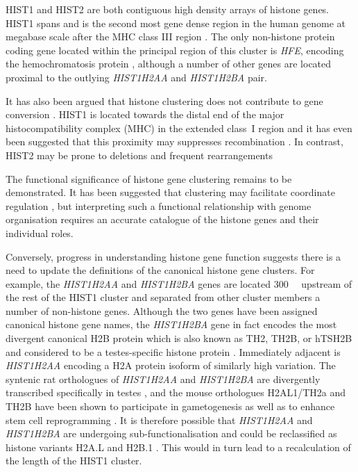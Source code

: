     HIST1 and HIST2 are both contiguous high density arrays of histone genes.
    HIST1 spans 
    and is the second most gene dense region in the human genome at
    megabase scale after the MHC class III region \citep{MHC-III-analysis}.
    The only non-histone protein coding gene located within the principal region of this cluster
    is \textit{HFE}, encoding the hemochromatosis protein \citep{AlbigDoenecke1998},
    although a number of other genes are located
    proximal to the outlying \textit{HIST1H2AA} and \textit{HIST1H2BA} pair.

    It has also been argued that histone clustering
    does not contribute to gene conversion \citep{NeiRooney2005}.
    HIST1 is located towards the distal end of the major histocompatibility complex (MHC)
    in the extended class~I region \citep{MHC-I-transcript, MHC-complete-sequencing-1999}
    and it has even been suggested that this proximity
    may suppresses recombination \citep{MHC-repressed-by-HIST}.
    In contrast, HIST2 may be prone to deletions and frequent rearrangements
    \citep{HISTTwo-prone-deletion-discovery, HISTTwo-prone-deletion-focus}

    The functional significance of histone gene clustering remains to be demonstrated.
    It has been suggested that clustering may facilitate coordinate regulation \citep{Eirinlopez2009,close-regulators},
    but interpreting such a functional relationship with genome organisation
    requires an accurate catalogue of the histone genes and their individual roles.

    Conversely, progress in understanding histone gene function
    suggests there is a need to update the definitions of the canonical histone gene clusters.
    For example, the \textit{HIST1H2AA} and \textit{HIST1H2BA} genes
    are located \SI{300}{\kilo\bp} upstream of the rest of the HIST1 cluster
    and separated from other cluster members a number of non-histone genes.
    Although the two genes have been assigned canonical histone gene names,
    the \textit{HIST1H2BA} gene in fact encodes the most divergent canonical H2B protein
    which is also known as TH2, TH2B, or hTSH2B and considered to be
    a testes-specific histone protein \citep{Zalensky2002,LiAusio2005,Shinagawa2014}.
    Immediately adjacent is \textit{HIST1H2AA} encoding
    a H2A protein isoform of similarly high variation.
    The syntenic rat orthologues of \textit{HIST1H2AA} and \textit{HIST1H2BA}
    are divergently transcribed specifically in testes \citep{HuhChae1991},
    and the mouse orthologues H2AL1/TH2a and TH2B have been shown to participate in gametogenesis \citep{GovinCaron2007}
    as well as to enhance stem cell reprogramming \citep{ShinagawaIshii2014,PadavattanKumarevel2015}.
    It is therefore possible that \textit{HIST1H2AA} and \textit{HIST1H2BA}
    are undergoing sub-functionalisation and could be reclassified
    as histone variants H2A.L and H2B.1 \citep{Talbert2012}.
    This would in turn lead to a recalculation of the length of the HIST1 cluster.

